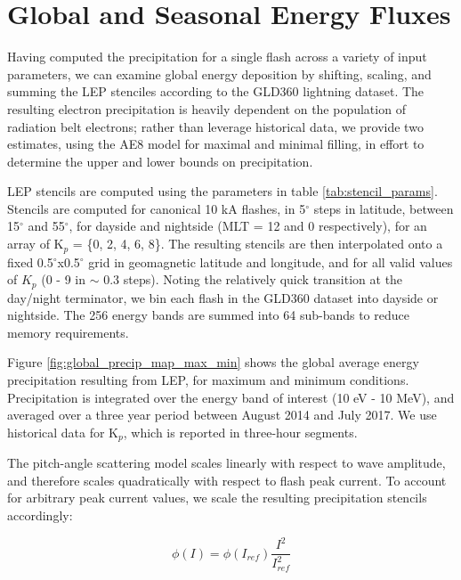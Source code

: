 

\section{Global and Seasonal Energy Fluxes}

Having computed the precipitation for a single flash across a variety of input parameters, we can examine global energy deposition by shifting, scaling, and summing the LEP stenciles according to the GLD360 lightning dataset. The resulting electron precipitation is heavily dependent on the population of radiation belt electrons; rather than leverage historical data, we provide two estimates, using the AE8 model for maximal and minimal filling, in effort to determine the upper and lower bounds on precipitation. 

LEP stencils are computed using the parameters in table \ref{tab:stencil_params}. Stencils are computed for canonical 10 kA flashes, in 5$^\circ$ steps in latitude, between 15$^\circ$ and 55$^\circ$, for dayside and nightside (MLT = 12 and 0 respectively), for an array of K$_p$ = \{0, 2, 4, 6, 8\}. The resulting stencils are then interpolated onto a fixed 0.5$^\circ$x0.5$^\circ$ grid in geomagnetic latitude and longitude, and for all valid values of $K_p$ (0 - 9 in $\sim$ 0.3 steps). Noting the relatively quick transition at the day/night terminator, we bin each flash in the GLD360 dataset into dayside or nightside. The 256 energy bands are summed into 64 sub-bands to reduce memory requirements. 

Figure \ref{fig:global_precip_map_max_min} shows the global average energy precipitation resulting from LEP, for maximum and minimum conditions. Precipitation is integrated over the energy band of interest (10 eV - 10 MeV), and averaged over a three year period between August 2014 and July 2017. We use historical data for K$_p$, which is reported in three-hour segments.

The pitch-angle scattering model scales linearly with respect to wave amplitude, and therefore scales quadratically with respect to flash peak current. To account for arbitrary peak current values, we scale the resulting precipitation stencils accordingly:

\begin{equation}
\phi(I) = \phi(I_{ref})\frac{I^2}{I_{ref}^2} 
\end{equation}

